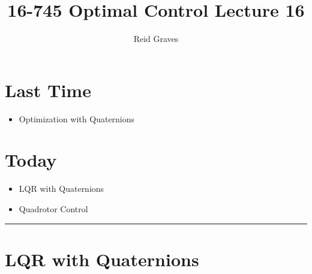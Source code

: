 \documentclass[11pt]{article}
\title{16-745 Optimal Control Lecture 16}
\author{Reid Graves}
\begin{document}
\maketitle

\section{Last Time}
\begin{itemize}
    \item Optimization with Quaternions
\end{itemize}

\section{Today}
\begin{itemize}
    \item LQR with Quaternions
    \item Quadrotor Control
\end{itemize}

\noindent\rule{\textwidth}{0.4pt} %
\section{LQR with Quaternions}
\end{document}
